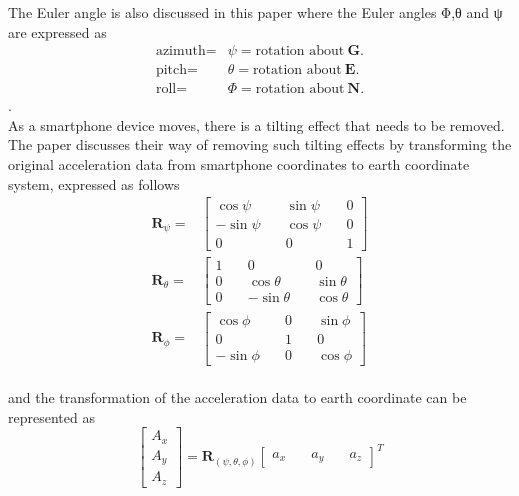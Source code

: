 \documentclass{l4proj}
\begin{document}
The Euler angle is also discussed in this paper where the Euler angles Φ,θ and ψ are expressed as
\begin{align*} \textrm {azimuth}=&\psi = \textrm {rotation about}~ {\boldsymbol {G}.} \\ \textrm {pitch}=&\theta = \textrm {rotation about}~ {\boldsymbol {E}.} \\ \textrm {roll}=&\Phi = \textrm {rotation about}~ {\boldsymbol {N}.}\end{align*} \cite{euler}.\\
As a smartphone device moves, there is a tilting effect that needs to be removed. The paper discusses their way of removing such tilting effects by transforming the original acceleration data from smartphone coordinates to earth coordinate system, expressed as follows
\begin{align*} {\boldsymbol {R}_\psi }=&\left [{ {\begin{array}{*{20}{c}} {\cos \psi }&\quad {\sin \psi }&\quad 0\\ { - \sin \psi }&\quad {\cos \psi }&\quad 0\\ 0&\quad 0&\quad 1 \end{array}} }\right] \tag{2}\\ {\boldsymbol {R}_\theta }=&\left [{ {\begin{array}{*{20}{c}} 1&\quad 0&\quad 0\\ 0&\quad {\cos \theta }&\quad {\sin \theta }\\ 0&\quad { - \sin \theta }&\quad {\cos \theta } \end{array}} }\right] \tag{3}\\ {\boldsymbol {R}_\phi }=&\left [{ {\begin{array}{*{20}{c}} {\cos \phi }&\quad 0&\quad {\sin \phi }\\ 0&\quad 1&\quad 0\\ { - \sin \phi }&\quad 0&\quad {\cos \phi } \end{array}} }\right]\tag{4}\end{align*}\cite{tilting}\\ and the transformation of the acceleration data to earth coordinate can be represented as
\begin{equation*} \left [{ {\begin{array}{*{20}{c}} {A_{x}}\\ {A_{y}}\\ {A_{z}} \end{array}} }\right] = {\boldsymbol {R}_{\left ({{\psi, \theta, \phi } }\right)}}{\left [{ {\begin{array}{*{20}{c}} {a_{x}}&\quad {a_{y}}&\quad {a_{z}} \end{array}} }\right]^{T}}\tag{5}\end{equation*}
\end{document}
